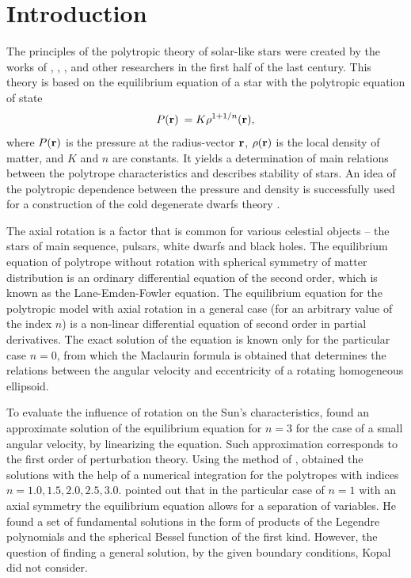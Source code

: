 \documentclass{caosp308}
\begin{document}
%

\section{Introduction}
\label{sect_01da}
The principles of the polytropic theory of solar-like stars were created by the works of  \citet{1870AmJS...50...57L}, \citet{1907gask.book.....E}, \citet{1930MNRAS..91...63F}, \citet{1926ics..book.....E} and other researchers in the first half of the last century. This theory is based on the equilibrium equation of a star with the polytropic equation of state
\begin{equation}
\label{eq_001da}
P ({\bf r})\:=K\rho^{1+1/n} ({\bf r}),
\end{equation}
where $P ({\bf r})$ is the pressure at the radius-vector ${\bf r}$,  $\rho({\bf r})$ is the local density of matter, and $K$ and $n$ are  constants. It yields a determination of main relations between the polytrope characteristics and describes stability of stars. An idea of the polytropic dependence between the pressure and density is successfully used for a construction of the cold degenerate dwarfs theory \citep{1931ApJ....74...81C}.

The axial rotation is a factor that is common for various celestial objects -- the stars of main sequence, pulsars, white dwarfs and black holes. The equilibrium equation of polytrope without rotation with spherical symmetry of matter distribution is an ordinary differential equation of the second order, which is known as the Lane-Emden-Fowler equation. The equilibrium equation for the polytropic model with axial rotation in a general case (for an arbitrary value of the index $n$) is a non-linear differential equation of second order in partial derivatives. The exact solution of the equation is known only for the particular case $n=0$, from which the Maclaurin formula  is obtained \citep[see][]{1969efe..book.....C} that determines the relations between the angular velocity and eccentricity of a rotating homogeneous ellipsoid.

To evaluate the influence of rotation on the Sun's characteristics, \citet{1923MNRAS..83..118M} found an approximate solution of the equilibrium equation for $n=3$ for the case of a small angular velocity, by linearizing the equation. Such approximation corresponds to the first order of perturbation theory. Using the method of  \citet{1923MNRAS..83..118M}, \citet{1933MNRAS..93..390C} obtained the solutions with the help of a numerical integration for the polytropes with indices $n=1.0, 1.5, 2.0, 2.5, 3.0$. \citet{1937ZA.....14..135K} pointed out that in the particular case of $n=1$ with an axial symmetry  the equilibrium equation allows for a separation of variables. He found a set of fundamental solutions in the form of products of the Legendre polynomials and the spherical Bessel function of the first kind. However, the question of finding a general solution, by the given boundary conditions, Kopal did not consider.
\end{document}
